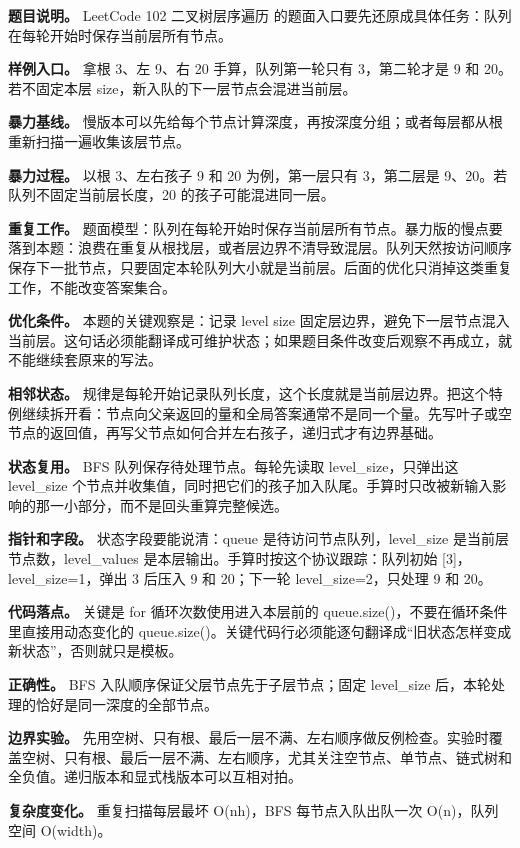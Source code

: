\textbf{题目说明。} LeetCode 102 二叉树层序遍历 的题面入口要先还原成具体任务：队列在每轮开始时保存当前层所有节点。

\textbf{样例入口。} 拿根 3、左 9、右 20 手算，队列第一轮只有 3，第二轮才是 9 和 20。若不固定本层 size，新入队的下一层节点会混进当前层。

\textbf{暴力基线。} 慢版本可以先给每个节点计算深度，再按深度分组；或者每层都从根重新扫描一遍收集该层节点。

\textbf{暴力过程。} 以根 3、左右孩子 9 和 20 为例，第一层只有 3，第二层是 9、20。若队列不固定当前层长度，20 的孩子可能混进同一层。

\textbf{重复工作。} 题面模型：队列在每轮开始时保存当前层所有节点。暴力版的慢点要落到本题：浪费在重复从根找层，或者层边界不清导致混层。队列天然按访问顺序保存下一批节点，只要固定本轮队列大小就是当前层。后面的优化只消掉这类重复工作，不能改变答案集合。

\textbf{优化条件。} 本题的关键观察是：记录 level size 固定层边界，避免下一层节点混入当前层。这句话必须能翻译成可维护状态；如果题目条件改变后观察不再成立，就不能继续套原来的写法。

\textbf{相邻状态。} 规律是每轮开始记录队列长度，这个长度就是当前层边界。把这个特例继续拆开看：节点向父亲返回的量和全局答案通常不是同一个量。先写叶子或空节点的返回值，再写父节点如何合并左右孩子，递归式才有边界基础。

\textbf{状态复用。} BFS 队列保存待处理节点。每轮先读取 level\_size，只弹出这 level\_size 个节点并收集值，同时把它们的孩子加入队尾。手算时只改被新输入影响的那一小部分，而不是回头重算完整候选。

\textbf{指针和字段。} 状态字段要能说清：queue 是待访问节点队列，level\_size 是当前层节点数，level\_values 是本层输出。手算时按这个协议跟踪：队列初始 [3]，level\_size=1，弹出 3 后压入 9 和 20；下一轮 level\_size=2，只处理 9 和 20。

\textbf{代码落点。} 关键是 for 循环次数使用进入本层前的 queue.size()，不要在循环条件里直接用动态变化的 queue.size()。关键代码行必须能逐句翻译成“旧状态怎样变成新状态”，否则就只是模板。

\textbf{正确性。} BFS 入队顺序保证父层节点先于子层节点；固定 level\_size 后，本轮处理的恰好是同一深度的全部节点。

\textbf{边界实验。} 先用空树、只有根、最后一层不满、左右顺序做反例检查。实验时覆盖空树、只有根、最后一层不满、左右顺序，尤其关注空节点、单节点、链式树和全负值。递归版本和显式栈版本可以互相对拍。

\textbf{复杂度变化。} 重复扫描每层最坏 O(nh)，BFS 每节点入队出队一次 O(n)，队列空间 O(width)。

